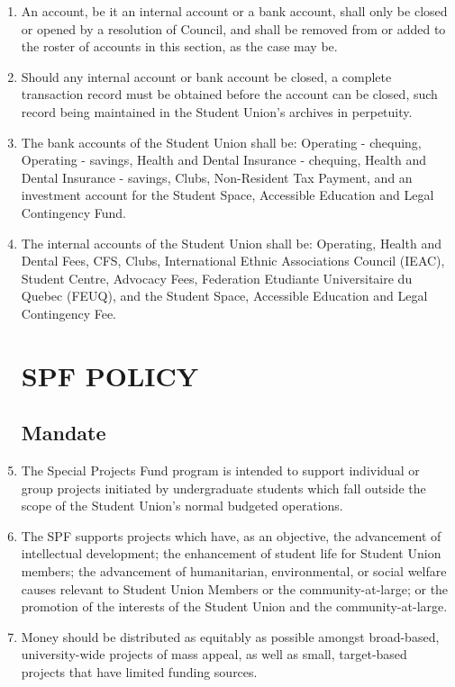 \documentclass[oneside]{book}
\begin{document}
\begin{enumerate}
\item An account, be it an internal account or a bank account, shall only be closed or opened by a resolution of Council, and shall be removed from or added to the roster of accounts in this section, as the case may be. 
\item Should any internal account or bank account be closed, a complete transaction record must be obtained before the account can be closed, such record being maintained in the Student Union’s archives in perpetuity.
\item \label{bank_accounts} The bank accounts of the Student Union shall be: Operating - chequing, Operating - savings, Health and Dental Insurance - chequing, Health and Dental Insurance - savings, Clubs, Non-Resident Tax Payment, and an investment account for the Student Space, Accessible Education and Legal Contingency Fund.
\item \label{internal_accounts} The internal accounts of the Student Union shall be: Operating, Health and Dental Fees, CFS, Clubs, International Ethnic Associations Council (IEAC), Student Centre, Advocacy Fees, Federation Etudiante Universitaire du Quebec (FEUQ), and the Student Space, Accessible Education and Legal Contingency Fee.

\part{\label{SPF_Policy}SPF POLICY}
\chapter{\label{SPF_mandate}Mandate}

\item The Special Projects Fund program is intended to support individual or group projects initiated by undergraduate students which fall outside the scope of the Student Union’s normal budgeted operations. 
\item The SPF supports projects which have, as an objective, the advancement of intellectual development; the enhancement of student life for Student Union members; the advancement of humanitarian, environmental, or social welfare causes relevant to Student Union Members or the community-at-large; or the promotion of the interests of the Student Union and the community-at-large. 
\item Money should be distributed as equitably as possible amongst broad-based, university-wide projects of mass appeal, as well as small, target-based projects that have limited funding sources.


\end{enumerate}
\end{document}
